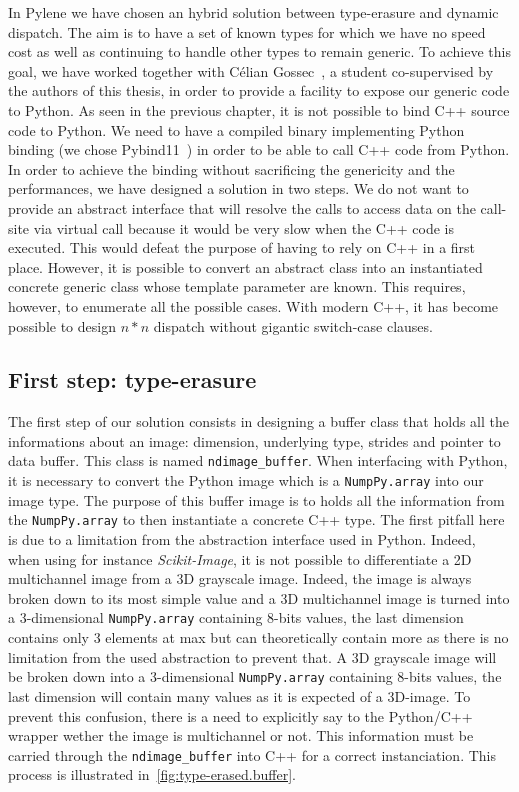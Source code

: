 In Pylene we have chosen an hybrid solution between type-erasure and dynamic dispatch. The aim is to have a set of known
types for which we have no speed cost as well as continuing to handle other types to remain generic. To achieve this
goal, we have worked together with Célian Gossec~\cite{gossec.2019.pybind}, a student co-supervised by the authors of
this thesis, in order to provide a facility to expose our generic code to Python. As seen in the previous chapter, it is
not possible to bind C++ source code to Python. We need to have a compiled binary implementing Python binding (we chose
Pybind11~\parencite{jakob.2017.pybind11}) in order to be able to call C++ code from Python. In order to achieve the
binding without sacrificing the genericity and the performances, we have designed a solution in two steps. We do not
want to provide an abstract interface that will resolve the calls to access data on the call-site via virtual call
because it would be very slow when the C++ code is executed. This would defeat the purpose of having to rely on C++ in a
first place. However, it is possible to convert an abstract class into an instantiated concrete generic class whose
template parameter are known. This requires, however, to enumerate all the possible cases. With modern C++, it has
become possible to design $n*n$ dispatch without gigantic switch-case clauses.

\subsection{First step: type-erasure}

The first step of our solution consists in designing a buffer class that holds all the informations about an image:
dimension, underlying type, strides and pointer to data buffer. This class is named \texttt{ndimage\_buffer}. When
interfacing with Python, it is necessary to convert the Python image which is a \texttt{NumpPy.array} into our image
type. The purpose of this buffer image is to holds all the information from the \texttt{NumpPy.array} to then
instantiate a concrete C++ type. The first pitfall here is due to a limitation from the abstraction interface used in
Python. Indeed, when using for instance \emph{Scikit-Image}, it is not possible to differentiate a 2D multichannel image
from a 3D grayscale image. Indeed, the image is always broken down to its most simple value and a 3D multichannel image
is turned into a 3-dimensional \texttt{NumpPy.array} containing 8-bits values, the last dimension contains only 3
elements at max but can theoretically contain more as there is no limitation from the used abstraction to prevent that.
A 3D grayscale image will be broken down into a 3-dimensional \texttt{NumpPy.array} containing 8-bits values, the last
dimension will contain many values as it is expected of a 3D-image. To prevent this confusion, there is a need to
explicitly say to the Python/C++ wrapper wether the image is multichannel or not. This information must be carried
through the \texttt{ndimage\_buffer} into C++ for a correct instanciation. This process is illustrated
in~\cref{fig:type-erased.buffer}.

